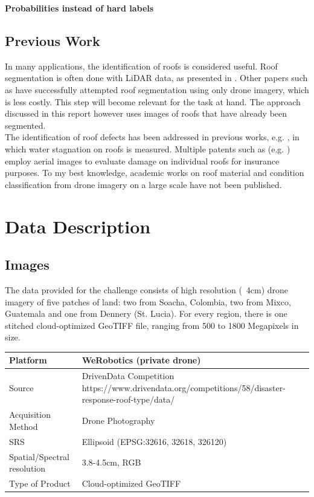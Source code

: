 \documentclass[11pt]{article}
\begin{document}
	\textbf{Probabilities instead of hard labels}
	
	\subsection{Previous Work}
	
	In many applications, the identification of roofs is considered useful. Roof segmentation is often done with LiDAR data, as presented in \cite{Chen2012}. Other papers such as \cite{Soman2019} have successfully attempted roof segmentation using only drone imagery, which is less costly. This step will become relevant for the task at hand. The approach discussed in this report however uses images of roofs that have already been segmented.\\
	
	The identification of roof defects has been addressed in previous works, e.g. \cite{Yudin2018}, in which water stagnation on roofs is measured. Multiple patents such as (e.g. \cite{Shreve2017}) employ aerial images to evaluate damage on individual roofs for insurance purposes. To my best knowledge, academic works on roof material and condition classification from drone imagery on a large scale have not been published. 
	
	\section{Data Description}
	
	\subsection{Images}
	
	The data provided for the challenge consists of high resolution (~4cm) drone imagery of five patches of land: two from Soacha, Colombia, two from Mixco, Guatemala and one from Dennery (St. Lucia).
	For every region, there is one stitched cloud-optimized GeoTIFF file, ranging from 500 to 1800 Megapixels in size.\\

	\begin{center}
		\begin{tabular}{ | m{5cm} | m{10cm}|} 
			\hline
			Platform & WeRobotics (private drone)  \\ 
			\hline
			Source & DrivenData Competition \newline https://www.drivendata.org/competitions/58/disaster-response-roof-type/data/ \\ 
			\hline
			Acquisition Method & Drone Photography  \\ 
			\hline
			SRS  & Ellipsoid (EPSG:32616, 32618, 326120)  \\ 
			\hline
			Spatial/Spectral resolution & 3.8-4.5cm, RGB  \\ 
			\hline
			Type of Product & Cloud-optimized GeoTIFF \\ 
			\hline
		\end{tabular}
	\end{center}
	
\end{document}
